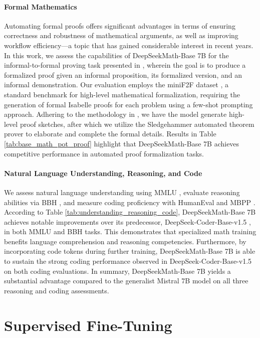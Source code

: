 \begin{itemize}[topsep=0pt]
\paragraph{Formal Mathematics}

Automating formal proofs offers significant advantages in terms of ensuring correctness and robustness of mathematical arguments, as well as improving workflow efficiency—a topic that has gained considerable interest in recent years. In this work, we assess the capabilities of DeepSeekMath-Base 7B for the informal-to-formal proving task presented in \citep{dsp_proof}, wherein the goal is to produce a formalized proof given an informal proposition, its formalized version, and an informal demonstration. Our evaluation employs the miniF2F dataset \citep{minif2f}, a standard benchmark for high-level mathematical formalization, requiring the generation of formal Isabelle proofs for each problem using a few-shot prompting approach. Adhering to the methodology in \cite{dsp_proof}, we have the model generate high-level proof sketches, after which we utilize the Sledgehammer automated theorem prover \citep{sledgehammer} to elaborate and complete the formal details. Results in Table \ref{tab:base_math_pot_proof} highlight that DeepSeekMath-Base 7B achieves competitive performance in automated proof formalization tasks.

\paragraph{Natural Language Understanding, Reasoning, and Code}

We assess natural language understanding using MMLU \citep{mmlu}, evaluate reasoning abilities via BBH \citep{bbh}, and measure coding proficiency with HumanEval \citep{codex} and MBPP \citep{mbpp}. According to Table \ref{tab:understanding_reasoning_code}, DeepSeekMath-Base 7B achieves notable improvements over its predecessor, DeepSeek-Coder-Base-v1.5 \citep{deepseek-coder}, in both MMLU and BBH tasks. This demonstrates that specialized math training benefits language comprehension and reasoning competencies. Furthermore, by incorporating code tokens during further training, DeepSeekMath-Base 7B is able to sustain the strong coding performance observed in DeepSeek-Coder-Base-v1.5 on both coding evaluations. In summary, DeepSeekMath-Base 7B yields a substantial advantage compared to the generalist Mistral 7B \citep{mistral} model on all three reasoning and coding assessments.

\section{Supervised Fine-Tuning}


\end{itemize}
